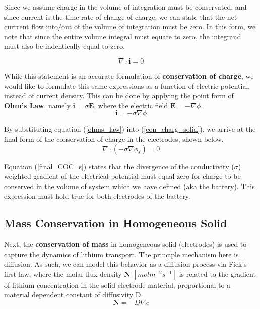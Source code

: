 \documentclass[lettersize,journal]{IEEEtran}
\begin{document}
\noindent Since we assume charge in the volume of integration must be conservated, and since current is the time rate of change of charge, we can state that the net currrent flow into/out of the volume of integration must be zero.  In this form, we note that since the entire volume integral must equate to zero, the integrand must also be indentically equal to zero.

\begin{equation} \label{con_charg_solid}
    \nabla \cdot \textbf{i} = 0
\end{equation}

While this statement is an accurate formulation of \textbf{conservation of charge}, we would like to formulate this same expressions as a function of electric potential, instead of current density. This can be done by applying the point form of \textbf{Ohm's Law}, namely $\textbf{i} = \sigma\textbf{E}$, where the electric field $\textbf{E} = -\nabla \phi$.
\begin{equation} \label{ohms_law}
  \textbf{i} = -\sigma \nabla \phi
\end{equation}

\noindent By substituting equation (\ref{ohms_law}) into (\ref{con_charg_solid}), we arrive at the final form of the conservation of charge in the electrodes, shown below.
\begin{equation} \label{final_COC_s}
  \nabla \cdot (-\sigma \nabla \phi_s) = 0
\end{equation}

Equation (\ref{final_COC_s}) states that the divergence of the conductivity ($\sigma$) weighted gradient of the electrical potential must equal zero for charge to be conserved in the volume of system which we have defined (aka the battery). This expression must hold true for both electrodes of the battery.

\subsection{Mass Conservation in Homogeneous Solid}

Next, the \textbf{conservation of mass} in homogeneous solid (electrodes) is used to capture the dynamics of lithium transport. The principle mechanism here is diffusion. As such, we can model this behavior as a diffusion process via Fick's first law, where the molar flux density \textbf{N} $[mol m^{-2} s^{-1}]$ is related to the gradient of lithium concentration in the solid electrode material, proportional to a material dependent constant of diffusivity D.
\begin{equation}\label{ficks_first}
    \textbf{N} =  -D \nabla c
\end{equation}
\end{document}
